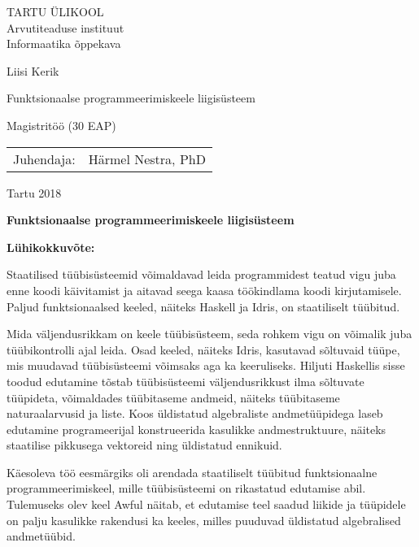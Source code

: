 \documentclass[12pt]{article}
\def\pealkiri{Funktsionaalse programmeerimiskeele liigisüsteem}
\begin{document}
  \thispagestyle{empty}
  \begin{center}
    \large
      TARTU ÜLIKOOL\\
      Arvutiteaduse instituut\\
      Informaatika õppekava

    \vspace{25mm}

    \Large
      Liisi Kerik

    \vspace{4mm}

    \huge
      \pealkiri

    \vspace{20mm}

    \Large
      Magistritöö (30 EAP)
  \end{center}

  \vspace{2mm}

  \begin{flushright}
    \begin{tabular}{rl} 
      Juhendaja: & Härmel Nestra, PhD
    \end{tabular}
  \end{flushright}
  \vfill
  \centerline{Tartu 2018}
  \newpage
  \noindent
  \textbf{\large\pealkiri}

  \vspace*{1ex}

  \noindent
  \textbf{Lühikokkuvõte:}

  \noindent
  Staatilised tüübisüsteemid võimaldavad leida programmidest teatud vigu juba enne koodi käivitamist ja aitavad seega kaasa töökindlama koodi kirjutamisele. Paljud funktsionaalsed keeled, näiteks Haskell ja Idris, on staatiliselt tüübitud.

  Mida väljendusrikkam on keele tüübisüsteem, seda rohkem vigu on võimalik juba tüübikontrolli ajal leida. Osad keeled, näiteks Idris, kasutavad sõltuvaid tüüpe, mis muudavad tüübisüsteemi võimsaks aga ka keeruliseks. Hiljuti Haskellis sisse toodud edutamine tõstab tüübisüsteemi väljendusrikkust ilma sõltuvate tüüpideta, võimaldades tüübitaseme andmeid, näiteks tüübitaseme naturaalarvusid ja liste. Koos üldistatud algebraliste andmetüüpidega laseb edutamine programeerijal konstrueerida kasulikke andmestruktuure, näiteks staatilise pikkusega vektoreid ning üldistatud ennikuid.

  Käesoleva töö eesmärgiks oli arendada staatiliselt tüübitud funktsionaalne programmeerimiskeel, mille tüübisüsteemi on rikastatud edutamise abil. Tulemuseks olev keel Awful näitab, et edutamise teel saadud liikide ja tüüpidele on palju kasulikke rakendusi ka keeles, milles puuduvad üldistatud algebralised andmetüübid.
\end{document}

